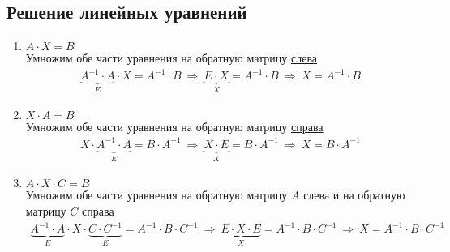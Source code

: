 \subsection{Решение линейных уравнений}
\begin{enumerate}
\item $A\cdot X = B$\\
Умножим обе части уравнения на обратную матрицу \underline{слева}
\begin{gather*}
\underbrace{A^{-1} \cdot A}_{E} \cdot X = A^{-1} \cdot B\ \Rightarrow\
\underbrace{E\cdot X}_{X} = A^{-1} \cdot B\ \Longrightarrow\ \boxed{X = A^{-1}\cdot B}
\end{gather*}
\item $X\cdot A = B$\\
Умножим обе части уравнения на обратную матрицу \underline{справа}
\begin{gather*}
X \cdot \underbrace{A^{-1} \cdot A}_{E} = B \cdot A^{-1}\ \Rightarrow\ \underbrace{X\cdot E}_{X} = B \cdot A^{-1}\ \Longrightarrow\ \boxed{X = B\cdot A^{-1}}
\end{gather*}
\item $A\cdot X\cdot C = B$ \\
Умножим обе части уравнения на обратную матрицу $A$ слева и на обратную матрицу $C$ справа
\begin{gather*}
\underbrace{A^{-1}\cdot A}_E \cdot X \cdot \underbrace{C \cdot C^{-1}}_{E} = A^{-1}\cdot B \cdot C^{-1}\ \Rightarrow\ \underbrace{E\cdot X\cdot E}_{X} = A^{-1}\cdot B \cdot C^{-1}\ \Longrightarrow\ X = \boxed{A^{-1}\cdot B \cdot C^{-1}}
\end{gather*}
\end{enumerate}
\newpage
